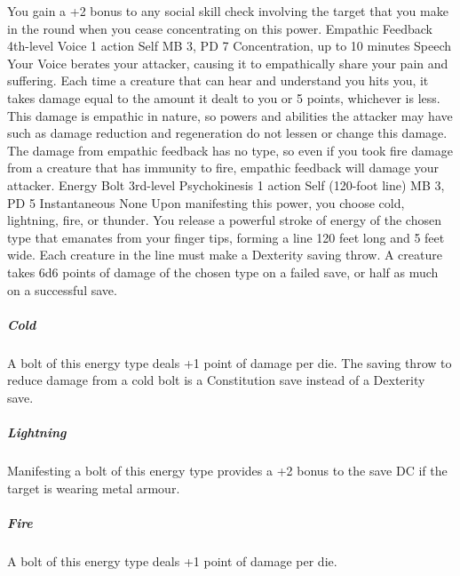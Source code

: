 You gain a +2 bonus to any social skill check involving the
target that you make in the round when you cease concentrating
on this power.
\DndPowerHeader%
    {Empathic Feedback\label{pwr:empathic_feedback}}
    {4th-level Voice}
    {1 action}
    {Self}
    {MB 3, PD 7}
    {Concentration, up to 10 minutes}
    {Speech}
Your Voice berates your attacker, causing
it to empathically share your pain and suffering. Each time
a creature that can hear and understand you hits you,
it takes damage equal to the amount it
dealt to you or 5 points, whichever is less. This damage is
empathic in nature, so powers and abilities the attacker may
have such as damage reduction and regeneration do not lessen
or change this damage. The damage from empathic feedback has
no type, so even if you took fire damage from a creature that
has immunity to fire, empathic feedback will damage your attacker.
\DndPowerHeader%
    {Energy Bolt\label{pwr:energy_bolt}}
    {3rd-level Psychokinesis}
    {1 action}
    {Self (120-foot line)}
    {MB 3, PD 5}
    {Instantaneous}
    {None}
Upon manifesting this power, you choose cold,
lightning, fire, or thunder. You release a powerful stroke
of energy of the chosen type that emanates from your finger
tips, forming a line 120 feet long and 5 feet wide. Each creature
in the line must make a Dexterity saving throw. A creature
takes 6d6 points of damage of the chosen type on a failed
save, or half as much on a successful save.

\subparagraph{Cold} A bolt of this energy type deals +1 point
of damage per die. The saving throw to reduce damage from
a cold bolt is a Constitution save instead of a Dexterity
save.

\subparagraph{Lightning} Manifesting a bolt of this energy
type provides a +2 bonus to the save DC if the target is wearing
metal armour.

\subparagraph{Fire} A bolt of this energy type deals +1 point
of damage per die.

